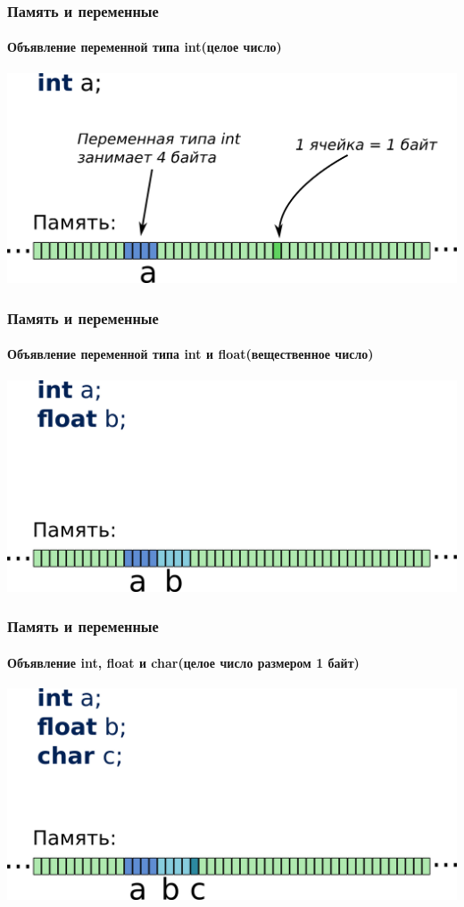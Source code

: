 \documentclass[12pt,pdf,hyperref={unicode}]{beamer}
\begin{document}
\begin{frame}[fragile]
\frametitle{Память и переменные} 
\framesubtitle{Объявление переменной типа int(целое число)} 
\begin{center}
\includegraphics[width=0.99\linewidth]{images/memory3.png}
\end{center}
\end{frame}

\begin{frame}[fragile]
\frametitle{Память и переменные} 
\framesubtitle{Объявление переменной типа int и float(вещественное число)} 
\begin{center}
\includegraphics[width=0.99\linewidth]{images/memory4.png}
\end{center}
\end{frame}

\begin{frame}[fragile]
\frametitle{Память и переменные} 
\framesubtitle{Объявление  int, float и char(целое число размером 1 байт)} 
\begin{center}
\includegraphics[width=0.99\linewidth]{images/memory5.png}
\end{center}
\end{frame}
\end{document}
